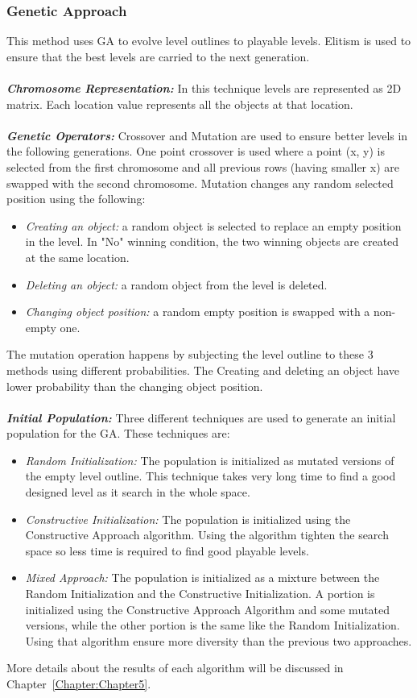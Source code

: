 \documentclass[letterpaper]{article}
\newcommand{\chref}[1]{Chapter~\ref{Chapter:#1}}
\begin{document}
\subsubsection{Genetic Approach}\label{Section:geneticApproach}
This method uses GA to evolve level outlines to playable levels. Elitism is used to ensure that the best levels are carried to the next generation.\\\\
\emph{\textbf{Chromosome Representation:}} In this technique levels are represented as 2D matrix. Each location value represents all the objects at that location.\\\\
\emph{\textbf{Genetic Operators:}} Crossover and Mutation are used to ensure better levels in the following generations. One point crossover is used where a point (x, y) is selected from the first chromosome and all previous rows (having smaller x) are swapped with the second chromosome. Mutation changes any random selected position using the following:
\begin{itemize}
	\item \emph{Creating an object:} a random object is selected to replace an empty position in the level. In "No" winning condition, the two winning objects are created at the same location.
	\item \emph{Deleting an object:} a random object from the level is deleted.
	\item \emph{Changing object position:} a random empty position is swapped with a non-empty one.
\end{itemize}
The mutation operation happens by subjecting the level outline to these 3 methods using different probabilities. The Creating and deleting an object have lower probability than the changing object position.\\\\
\emph{\textbf{Initial Population:}} Three different techniques are used to generate an initial population for the GA. These techniques are:
\begin{itemize}
	\item \emph{Random Initialization:} The population is initialized as mutated versions of the empty level outline. This technique takes very long time to find a good designed level as it search in the whole space.
	\item \emph{Constructive Initialization:} The population is initialized using the Constructive Approach algorithm. Using the algorithm tighten the search space so less time is required to find good playable levels.
	\item \emph{Mixed Approach:} The population is initialized as a mixture between the Random Initialization and the Constructive Initialization. A portion is initialized using the Constructive Approach Algorithm and some mutated versions, while the other portion is the same like the Random Initialization. Using that algorithm ensure more diversity than the previous two approaches.
\end{itemize}
More details about the results of each algorithm will be discussed in \chref{Chapter5}.
\end{document}
